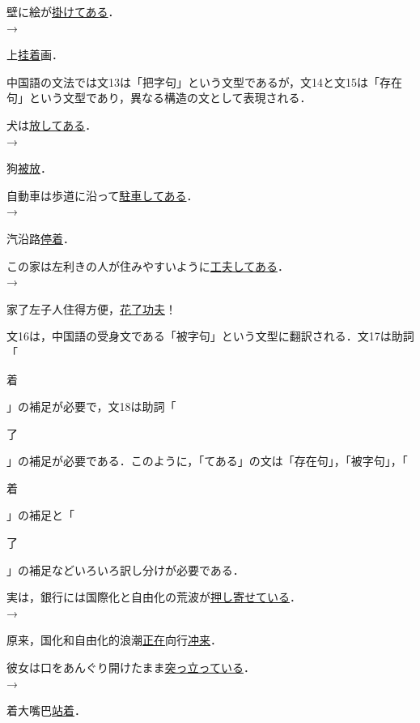\documentclass[japanese]{jnlp_1.4}
\newcommand{\inHRei}[1]{}
\begin{document}
\inHRei{(15)}
壁に絵が\ul{掛けてある}．\\
→\begin{簡体中文}上\ul{挂着}画．\end{簡体中文}

中国語の文法では文13は「把字句」という文型であるが，文14と文15は「存在句」という文型であり，異なる構造の文として表現される．

\inHRei{(16)}
犬は\ul{放してある}．\\
→\begin{簡体中文}狗\ul{被放\mbox{}}．\end{簡体中文}

\inHRei{(17)}
自動車は歩道に沿って\ul{駐車してある}．\\
→\begin{簡体中文}汽沿路\ul{停着}．\end{簡体中文}

\inHRei{(18)}
この家は左利きの人が住みやすいように\ul{工夫してある}．\\
→\begin{簡体中文}家了左子人住得方便，\ul{花了功夫}！\end{簡体中文}

文16は，中国語の受身文である「被字句」という文型に翻訳される．文17は助詞「\begin{簡体中文}着\end{簡体中文}」の補足が必要で，文18は助詞「\begin{簡体中文}了\end{簡体中文}」の補足が必要である．このように，「てある」の文は「存在句」，「被字句」，「\begin{簡体中文}着\end{簡体中文}」の補足と「\begin{簡体中文}了\end{簡体中文}」の補足などいろいろ訳し分けが必要である．

\inHRei{(19)}
実は，銀行には国際化と自由化の荒波が\ul{押し寄せている}．\\
→\begin{簡体中文}原来，国化和自由化的浪潮\ul{正在}向行\ul{冲来}．\end{簡体中文}

\inHRei{(20)}
彼女は口をあんぐり開けたまま\ul{突っ立っている}．\\
→\begin{簡体中文}着大嘴巴\ul{站着}．\end{簡体中文}
\end{document}
